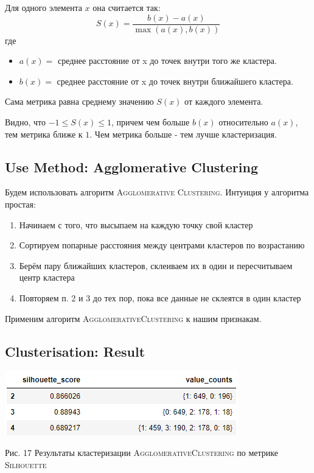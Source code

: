 \documentclass[%
10pt, %
final, %
oneside, %
onecolumn, %
centertags]{article} %
\theoremstyle{plain}
\theoremstyle{definition}
\theoremstyle{remark}
\begin{document}
Для одного элемента $x$ она считается так:
$$S(x) = \frac{b(x) - a(x)}{\max{(a(x), b(x))}}$$
где
\begin{itemize}
 	\item $a(x) =$ среднее расстояние от x до точек внутри того же кластера.
 	\item $b(x) = $ среднее расстояние от x до точек внутри ближайшего кластера.
\end{itemize} 

Сама метрика равна среднему значению $S(x)$ от каждого элемента.

Видно, что $-1 \leqslant S(x) \leqslant 1$, причем чем больше $b(x)$ относительно $a(x)$, тем метрика ближе к $1$. Чем метрика больше - тем лучше кластеризация.

\subsection{Use Method: Agglomerative Clustering}

Будем использовать алгоритм \textsc{Agglomerative Clustering}. Интуиция у алгоритма простая:
\begin{enumerate}
	\item Начинаем с того, что высыпаем на каждую точку свой кластер
	\item Сортируем попарные расстояния между центрами кластеров по возрастанию
	\item Берём пару ближайших кластеров, склеиваем их в один и пересчитываем центр кластера
	\item Повторяем п. 2 и 3 до тех пор, пока все данные не склеятся в один кластер
\end{enumerate}

Применим алгоритм \textsc{AgglomerativeClustering} к нашим признакам.

\subsection{Clusterisation: Result}
\begin{center}
	\includegraphics[scale=0.6]{17.png}

 	Рис. 17 Результаты кластеризации \textsc{AgglomerativeClustering} по метрике \textsc{Silhouette}
	\end{center}
\end{document}
